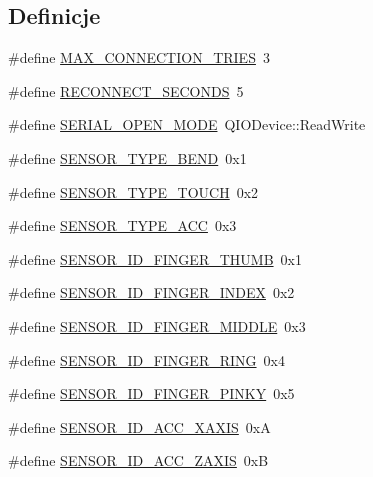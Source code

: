 \subsection*{Definicje}
\begin{DoxyCompactItemize}
\item 
\#define \hyperlink{mainwindow_8hh_a1ea231a8a3794a585a1953308703a0cd}{M\+A\+X\+\_\+\+C\+O\+N\+N\+E\+C\+T\+I\+O\+N\+\_\+\+T\+R\+I\+ES}~3
\item 
\#define \hyperlink{mainwindow_8hh_acbbf321629e1be450eff55ef03661fe7}{R\+E\+C\+O\+N\+N\+E\+C\+T\+\_\+\+S\+E\+C\+O\+N\+DS}~5
\item 
\#define \hyperlink{mainwindow_8hh_a258676243bfb197499602aa8bd13b433}{S\+E\+R\+I\+A\+L\+\_\+\+O\+P\+E\+N\+\_\+\+M\+O\+DE}~Q\+I\+O\+Device\+::\+Read\+Write
\item 
\#define \hyperlink{mainwindow_8hh_ad6ed6f841b9472c646777bf2c1eaca2f}{S\+E\+N\+S\+O\+R\+\_\+\+T\+Y\+P\+E\+\_\+\+B\+E\+ND}~0x1
\item 
\#define \hyperlink{mainwindow_8hh_a2d58e88ceaa8bf1d0658ce2c7e8d1394}{S\+E\+N\+S\+O\+R\+\_\+\+T\+Y\+P\+E\+\_\+\+T\+O\+U\+CH}~0x2
\item 
\#define \hyperlink{mainwindow_8hh_ac8296e50ce9f4e906d7f4295faf90e90}{S\+E\+N\+S\+O\+R\+\_\+\+T\+Y\+P\+E\+\_\+\+A\+CC}~0x3
\item 
\#define \hyperlink{mainwindow_8hh_a45e76448b7999cec2cc61a2f4e7c7e95}{S\+E\+N\+S\+O\+R\+\_\+\+I\+D\+\_\+\+F\+I\+N\+G\+E\+R\+\_\+\+T\+H\+U\+MB}~0x1
\item 
\#define \hyperlink{mainwindow_8hh_a5fc5c2ae1e1f61351ec696b2845f929d}{S\+E\+N\+S\+O\+R\+\_\+\+I\+D\+\_\+\+F\+I\+N\+G\+E\+R\+\_\+\+I\+N\+D\+EX}~0x2
\item 
\#define \hyperlink{mainwindow_8hh_a1c2b4b75c80610c096765ea2b9e53eab}{S\+E\+N\+S\+O\+R\+\_\+\+I\+D\+\_\+\+F\+I\+N\+G\+E\+R\+\_\+\+M\+I\+D\+D\+LE}~0x3
\item 
\#define \hyperlink{mainwindow_8hh_ac41d46587af96c140b0503858d2a5bfd}{S\+E\+N\+S\+O\+R\+\_\+\+I\+D\+\_\+\+F\+I\+N\+G\+E\+R\+\_\+\+R\+I\+NG}~0x4
\item 
\#define \hyperlink{mainwindow_8hh_a4a6cf2ac7f94a999fe9545e399c38ec6}{S\+E\+N\+S\+O\+R\+\_\+\+I\+D\+\_\+\+F\+I\+N\+G\+E\+R\+\_\+\+P\+I\+N\+KY}~0x5
\item 
\#define \hyperlink{mainwindow_8hh_a075d9f9977df6407e9ba9114e2ebab6e}{S\+E\+N\+S\+O\+R\+\_\+\+I\+D\+\_\+\+A\+C\+C\+\_\+\+X\+A\+X\+IS}~0xA
\item 
\#define \hyperlink{mainwindow_8hh_a5686bc69fd25a3fba41c883d76ae6644}{S\+E\+N\+S\+O\+R\+\_\+\+I\+D\+\_\+\+A\+C\+C\+\_\+\+Z\+A\+X\+IS}~0xB

\end{DoxyCompactItemize}
